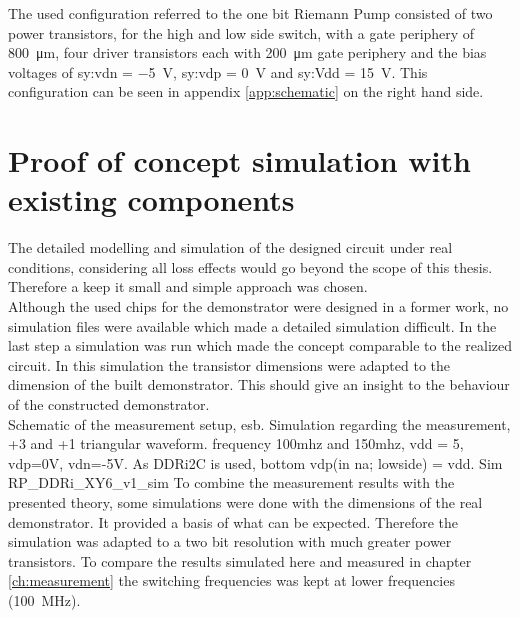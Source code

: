 The used configuration referred to the one bit Riemann Pump consisted of two power transistors, for the high and low side switch, with a gate periphery of \SI{800}{\micro \meter}, four driver transistors each with \SI{200}{\micro \meter} gate periphery and the bias voltages of \gls{sy:vdn} = \SI{-5}{\volt}, \gls{sy:vdp} = \SI{0}{\volt} and \gls{sy:Vdd} = \SI{15}{\volt}.
This configuration can be seen in appendix \ref{app:schematic} on the right hand side.
\section{Proof of concept simulation with existing components}
\label{ch:ProofOfConceptWithExistingComponents}
The detailed modelling and simulation of the designed circuit under real conditions, considering all loss effects would go beyond the scope of this thesis. Therefore a keep it small and simple approach was chosen.\\   
Although the used chips for the demonstrator were designed in a former work, no simulation files were available which made a detailed simulation difficult.
In the last step a simulation was run which made the concept comparable to the realized circuit. 
In this simulation the transistor dimensions were adapted to the dimension of the built demonstrator. 
This should give an insight to the behaviour of the constructed demonstrator.\\
Schematic of the measurement setup, esb.
Simulation regarding the measurement, +3 and +1 triangular waveform.
frequency 100mhz and 150mhz, vdd = 5, vdp=0V, vdn=-5V.
As DDRi2C is used, bottom vdp(in na; lowside) = vdd. 
Sim RP\_DDRi\_XY6\_v1\_sim
To combine the measurement results with the presented theory, some simulations were done with the dimensions of the real demonstrator.
It provided a basis of what can be expected.
Therefore the simulation was adapted to a two bit resolution with much greater power transistors.
To compare the results simulated here and measured in chapter \ref{ch:measurement} the switching frequencies was kept at lower frequencies (\SI{100}{\mega \hertz}).

